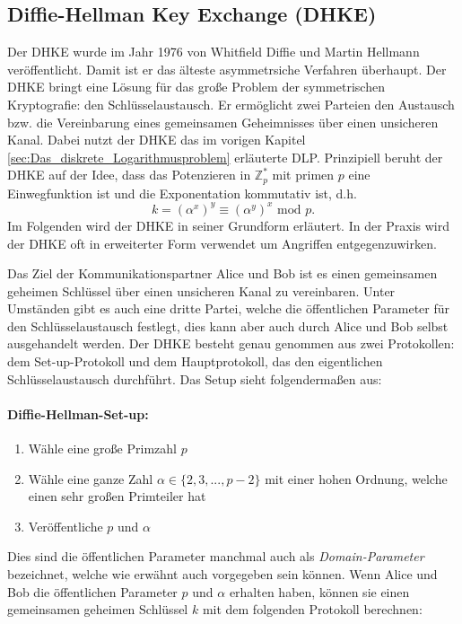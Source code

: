 \subsection{Diffie-Hellman Key Exchange (DHKE)} \label{sec:DHKE}
Der DHKE wurde im Jahr 1976 von Whitfield Diffie und Martin Hellmann veröffentlicht. Damit ist er das älteste asymmetrsiche Verfahren überhaupt. Der DHKE bringt eine Lösung für das große Problem der symmetrischen Kryptografie: den Schlüsselaustausch. Er ermöglicht zwei Parteien den Austausch bzw. die Vereinbarung eines gemeinsamen Geheimnisses über einen unsicheren Kanal. Dabei nutzt der DHKE das im vorigen Kapitel \ref{sec:Das_diskrete_Logarithmusproblem} erläuterte DLP.  Prinzipiell beruht der DHKE auf der Idee, dass das Potenzieren in $\mathbb{Z}^*_p$ mit primen $p$ eine Einwegfunktion ist und die Exponentation kommutativ ist, d.h. $$k = (\alpha ^x)^y \equiv (\alpha ^y)^x \text{ mod } p.$$
Im Folgenden wird der DHKE in seiner Grundform erläutert. In der Praxis wird der DHKE oft in erweiterter Form verwendet um Angriffen entgegenzuwirken.

Das Ziel der Kommunikationspartner Alice und Bob ist es einen gemeinsamen geheimen Schlüssel über einen unsicheren Kanal zu vereinbaren. Unter Umständen gibt es auch eine dritte Partei, welche die öffentlichen Parameter für den Schlüsselaustausch festlegt, dies kann aber auch durch Alice und Bob selbst ausgehandelt werden. Der DHKE besteht genau genommen aus zwei Protokollen: dem Set-up-Protokoll und dem Hauptprotokoll, das den eigentlichen Schlüsselaustausch durchführt. Das Setup sieht folgendermaßen aus:
\paragraph{Diffie-Hellman-Set-up:}
\begin{enumerate}
\item Wähle eine große Primzahl $p$
\item Wähle eine ganze Zahl $\alpha \in \{2,3,..., p-2\}$ mit einer hohen Ordnung, welche einen sehr großen Primteiler hat
\item Veröffentliche $p$ und $\alpha$
\end{enumerate}

Dies sind die öffentlichen Parameter manchmal auch als \textit{Domain-Parameter} bezeichnet, welche wie erwähnt auch vorgegeben sein können. Wenn Alice und Bob die öffentlichen Parameter $p$ und $\alpha$ erhalten haben, können sie einen gemeinsamen geheimen Schlüssel $k$ mit dem folgenden Protokoll berechnen:

